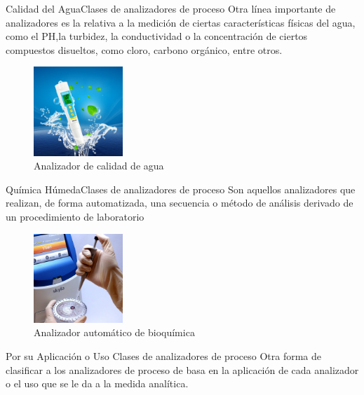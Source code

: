 \documentclass[10pt]{beamer}
\begin{document}
{\begin{frame}{Calidad del Agua}{Clases de analizadores de proceso}
Otra línea importante de analizadores es la relativa a la medición de ciertas características físicas del agua, como el PH,la turbidez, la conductividad o la concentración de ciertos compuestos disueltos, como cloro, carbono orgánico, entre otros. 
\begin{figure}%
\includegraphics[width=0.3\textwidth]{figura_17.jpg} %
\caption{\label{fig:13}Analizador de calidad de agua} %
\end{figure}
\end{frame}
\begin{frame}{Química Húmeda}{Clases de analizadores de proceso}
Son aquellos analizadores que realizan, de forma automatizada, una secuencia o método de análisis derivado de un procedimiento de laboratorio 
\begin{figure}%
\includegraphics[width=0.3\textwidth]{figura_18.jpg} %
\caption{\label{fig:14}Analizador automático de bioquímica} %
\end{figure}
\end{frame}
 \begin{frame}{Por su Aplicación o Uso }{Clases de analizadores de proceso}
 Otra forma de clasificar a los analizadores de proceso de basa en la aplicación de cada analizador o el uso que se le da a la medida analítica. 

\end{frame}}
\end{document}

